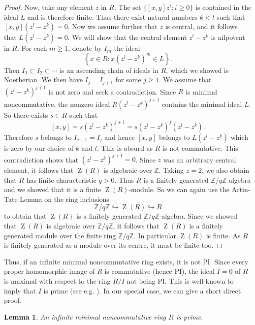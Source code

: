 \documentclass[11pt]{article}
\DeclareMathOperator{\Z}{Z}
\newtheorem{lemma}[corollary]{Lemma}
\theoremstyle{definition}
\begin{document}
\begin{proof}
Now, take any element $z$ in $R$. The set $\lbrace [x,y]z^i:i\geq 0\rbrace$ is contained in the ideal $L$ and is therefore finite. Thus there exist natural numbers $k<l$ such that $[x,y](z^l-z^k)=0$. Now we assume further that $z$ is central, and it follows that $L(z^l-z^k)=0$. We will show that the central element $z^l-z^k$ is nilpotent in $R$. For each $m\geq 1$, denote by $I_m$ the ideal
\[\left\lbrace x\in R: x\left(z^l-z^k\right)^m\in L\right\rbrace.\]
Then $I_1\subset I_2\subset\cdots$ is an ascending chain of ideals in $R$, which we showed is Noetherian. We then have $I_j=I_{j+1}$ for some $j\geq 1$. We assume that $(z^l-z^k)^{j+1}$ is not zero and seek a contradiction. Since $R$ is minimal noncommutative, the nonzero ideal $R(z^l-z^k)^{j+1}$ contains the minimal ideal $L$. So there exists $s\in R$ such that
\[[x,y]=s(z^l-z^k)^{j+1}=s(z^l-z^k)^j(z^l-z^k).\]
Therefore $s$ belongs to $I_{j+1}=I_j$ and hence $[x,y]$ belongs to $L(z^l-z^k)$ which is zero by our choice of $k$ and $l$. This is absurd as $R$ is not commutative. This contradiction shows that $(z^l-z^k)^{j+1}=0$. Since $z$ was an arbitrary central element, it follows that $\Z(R)$ is algebraic over $\mathbb{Z}$. Taking $z=2$, we also obtain that $R$ has finite characteristic $q>0$. Thus $R$ is a finitely generated $\mathbb{Z}/q\mathbb{Z}$-algebra and we showed that it is a finite $\Z(R)$-module. So we can again use the Artin-Tate Lemma on the ring inclusions
\[\mathbb{Z}/q\mathbb{Z}\hookrightarrow\Z(R)\hookrightarrow R\]
to obtain that $\Z(R)$ is a finitely generated $\mathbb{Z}/q\mathbb{Z}$-algebra. Since we showed that $\Z(R)$ is algebraic over $\mathbb{Z}/q\mathbb{Z}$, it follows that $\Z(R)$ is a finitely generated module over the finite ring $\mathbb{Z}/q\mathbb{Z}$. In particular $\Z(R)$ is finite. As $R$ is finitely generated as a module over its centre, it must be finite too.
\end{proof}

Thus, if an infinite minimal noncommutative ring exists, it is not PI. Since every proper homomorphic image of $R$ is commutative (hence PI), the ideal $I=0$ of $R$ is maximal with respect to the ring $R/I$ not being PI. This is well-known to imply that $I$ is prime (see e.g. \cite[Proposition~3.4]{Reyes_PIPforIdeals}). In our special case, we can give a short direct proof.

\begin{lemma}\label{InfiniteMinimalNoncommutativeIsPrime}
An infinite minimal noncommutative ring $R$ is prime.
\end{lemma}
\end{document}
